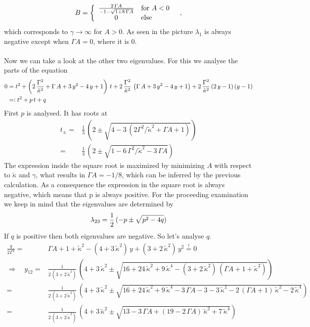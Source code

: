 \documentclass{article}
\begin{document}
\begin{align*}
    B=\bigg\{\begin{array}{c l}
          \frac{2\,\Gamma A}{-1-\sqrt{1+8\,\Gamma A}}&\text{for }A<0\\
         0&\text{else}
    \end{array}\quad,
\end{align*}
which corresponds to $\gamma\rightarrow\infty$ for $A>0$.
As seen in the picture $\lambda_1$ is always negative except when $\Gamma A=0$, where it is $0$.\\\\\newpage
Now we can take a look at the other two eigenvalues. For this we analyse the parts of the equation 
\begin{align*}
    0&=t^2+\left( 2\,\frac{\Gamma^2}{\tilde{\kappa}^2}+\Gamma\,A+3\,y^2-4\,y+1  \right)\,t+2\,\frac{\Gamma^2}{\tilde{\kappa}^2}\,\left( \Gamma\,A+3\,y^2-4\,y+1 \right)+2\,\frac{\Gamma^2}{\tilde{\kappa}^2}\,(2\,y-1)\,(y-1)\\
    &=\vcentcolon t^2+p\,t+q
\end{align*}
First $p$ is analysed. It has roots at
\begin{align*}
    t_{\pm}=&\frac{1}{3}\,\left(  2\pm \sqrt{4-3\,(2\Gamma^2/\tilde{\kappa}^2+\Gamma A + 1)} \right)\\
    =&\frac{1}{3}\,\left(  2\pm \sqrt{1-6\,\Gamma^2/\tilde{\kappa}^2-3\,\Gamma A} \right)
\end{align*}
The expression inside the square root is maximized by minimizing $A$ with respect to $\tilde{\kappa}$ and $\gamma$, what results in $\Gamma A = -1/8$, which can be inferred by the previous calculation. As a consequence the expression in the square root is always negative, which means that p is always positive. For the proceeding examination we keep in mind that the eigenvalues are determined by
\begin{align*}
    \lambda_{23}=\frac{1}{2}\,(-p\pm\sqrt{p^2-4q})
\end{align*}
If $q$ is positive then both eigenvalues are negative. So let's analyse $q$. 
\begin{align*}
    \frac{q}{2\Gamma^2}=&\Gamma A +1 +\tilde{\kappa}^2-(4+3\,\tilde{\kappa}^2)\,y+(3+2\,\tilde{\kappa}^2)\,y^2\overset{!}{=}0\\
    \Rightarrow\quad y_{12}=&\frac{1}{2\,(3+2\,\tilde{\kappa}^2)}\,\left( 4+3\,\tilde{\kappa}^2\pm \sqrt{16+24\,\tilde{\kappa}^2+9\,\tilde{\kappa}^4-(3+2\,\tilde{\kappa}^2)\,(\Gamma A +1 +\tilde{\kappa}^2)}   \right)\\
    =&\frac{1}{2\,(3+2\,\tilde{\kappa}^2)}\,\left( 4+3\,\tilde{\kappa}^2\pm \sqrt{16+24\,\tilde{\kappa}^2+9\,\tilde{\kappa}^4 -3\,\Gamma A -3 -3\,\tilde{\kappa}^2-2\,(\Gamma A+1)\,\tilde{\kappa}^2-2\,\tilde{\kappa}^4}   \right)\\
    =&\frac{1}{2\,(3+2\,\tilde{\kappa}^2)}\,\left( 4+3\,\tilde{\kappa}^2\pm \sqrt{13-3\,\Gamma A+(19-2\,\Gamma A)\,\tilde{\kappa}^2+7\,\tilde{\kappa}^4}   \right)\\
\end{align*}
\end{document}
